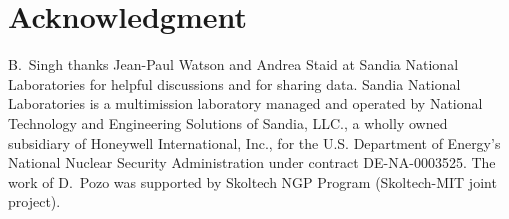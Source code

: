 \documentclass[letter]{IEEEtran}
\begin{document}
%




\section*{Acknowledgment}

B.\ Singh thanks Jean-Paul Watson and Andrea Staid at Sandia National 
Laboratories for helpful discussions and for sharing data. 
Sandia National Laboratories is a multimission laboratory managed and operated 
by National Technology and Engineering Solutions of Sandia, LLC., a wholly owned
subsidiary of Honeywell International, Inc., for the U.S. Department of 
Energy's 
National Nuclear Security Administration under contract DE-NA-0003525.
The work of D.\ Pozo was supported by Skoltech NGP Program (Skoltech-MIT joint 
project).
\end{document}
